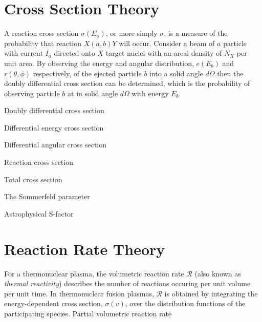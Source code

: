\section{Cross Section Theory}
A reaction cross section $\sigma(E_a)$, or more simply $\sigma$, is a
measure of the probability that reaction $X(a,b)Y$ will occur.
Consider a beam of $a$ particle with current $I_a$ directed onto $X$
target nuclei with an areal density of $N_X$ per unit area.  By
observing the energy and angular distribution, $e(E_b)$ and
$r(\theta,\phi)$ respectively, of the ejected particle $b$ into a
solid angle $d\Omega$ then the doubly differential cross section can
be determined, which is the probability of observing particle $b$ at
in solid angle $d\Omega$ with energy $E_b$. 
\newline
\newline

\noindent
Doubly differential cross section 

\noindent
Differential energy cross section 

\noindent
Differential angular cross section 

\noindent
Reaction cross section 

\noindent
Total cross section 

\noindent
The Sommerfeld parameter 

\noindent
Astrophysical S-factor 


\section{Reaction Rate Theory}
For a thermonuclear plasma, the volumetric reaction rate $\mathcal{R}$
(also known as \textit{thermal reactivity}) describes the number of
reactions occuring per unit volume per unit time.  In thermonuclear
fusion plasmas, $\mathcal{R}$ is obtained by integrating the
energy-dependent cross section, $\sigma(v)$, over the distribution
functions of the participating species. 
\newline
\newline
\noindent
Partial volumetric reaction rate 

